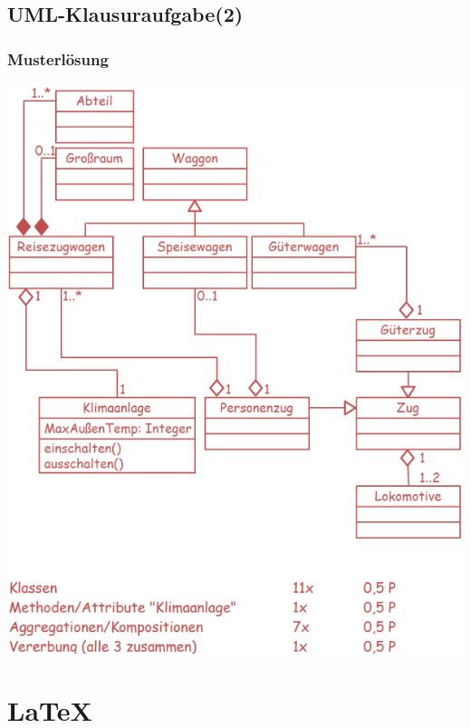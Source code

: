 \documentclass[18pt]{beamer}
\begin{document}
	\subsection{UML-Klausuraufgabe(2)}
	\begin{frame}
		\frametitle{Musterlösung}
		\centering
		\includegraphics[scale=0.37]{./pics/tut1/solution.png}
	\end{frame}
		
		
\section{\LaTeX}
\end{document}
